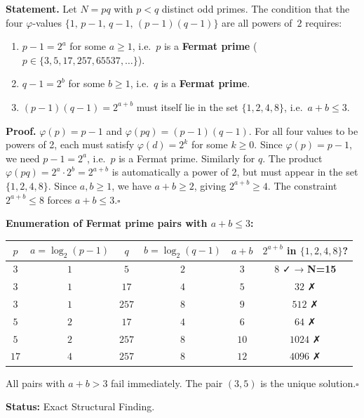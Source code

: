 \documentclass[12pt, a4paper]{article}
\begin{document}
\begin{derivedbox}[title={FIND-ZC74-01: Binary Ladder Requires
  $p, q$ to Be Fermat Primes with $(p-1)(q-1) \leq 8$
  ($R_0$, Exact)}]

\textbf{Statement.}
Let $N = pq$ with $p < q$ distinct odd primes.
The condition that the four $\varphi$-values
$\{1,\, p-1,\, q-1,\, (p-1)(q-1)\}$ are all powers of~$2$
requires:
\begin{enumerate}[leftmargin=2em, noitemsep]
  \item $p - 1 = 2^a$ for some $a \geq 1$, i.e.\ $p$ is a
    \textbf{Fermat prime} ($p \in \{3, 5, 17, 257, 65537, \ldots\}$).
  \item $q - 1 = 2^b$ for some $b \geq 1$, i.e.\ $q$ is a
    \textbf{Fermat prime}.
  \item $(p-1)(q-1) = 2^{a+b}$ must itself lie in the set
    $\{1, 2, 4, 8\}$, i.e.\ $a + b \leq 3$.
\end{enumerate}

\textbf{Proof.}
$\varphi(p) = p-1$ and $\varphi(pq) = (p-1)(q-1)$.
For all four values to be powers of 2, each must satisfy
$\varphi(d) = 2^k$ for some $k \geq 0$.
Since $\varphi(p) = p-1$, we need $p-1 = 2^a$, i.e.\ $p$ is a
Fermat prime. Similarly for $q$.
The product $\varphi(pq) = 2^a \cdot 2^b = 2^{a+b}$ is automatically
a power of 2, but must appear in the set $\{1, 2, 4, 8\}$.
Since $a, b \geq 1$, we have $a + b \geq 2$, giving
$2^{a+b} \geq 4$. The constraint $2^{a+b} \leq 8$ forces
$a + b \leq 3$.\hfill$\square$

\textbf{Enumeration of Fermat prime pairs with $a + b \leq 3$:}

\medskip
\begin{center}
{\small\renewcommand{\arraystretch}{1.35}
\begin{tabular}{@{}cccccc@{}}
\toprule
$p$ & $a = \log_2(p-1)$ & $q$ & $b = \log_2(q-1)$
  & $a+b$ & $2^{a+b}$ in $\{1,2,4,8\}$? \\
\midrule
$3$  & $1$ & $5$   & $2$ & $3$ & $8$ ✓ → \textbf{N=15} \\
$3$  & $1$ & $17$  & $4$ & $5$ & $32$ ✗ \\
$3$  & $1$ & $257$ & $8$ & $9$ & $512$ ✗ \\
$5$  & $2$ & $17$  & $4$ & $6$ & $64$ ✗ \\
$5$  & $2$ & $257$ & $8$ & $10$ & $1024$ ✗ \\
$17$ & $4$ & $257$ & $8$ & $12$ & $4096$ ✗ \\
\bottomrule
\end{tabular}
}
\end{center}

\medskip
All pairs with $a + b > 3$ fail immediately.
The pair $(3, 5)$ is the unique solution.\hfill$\square$

\textbf{Status:} Exact Structural Finding.
\end{derivedbox}
\end{document}
